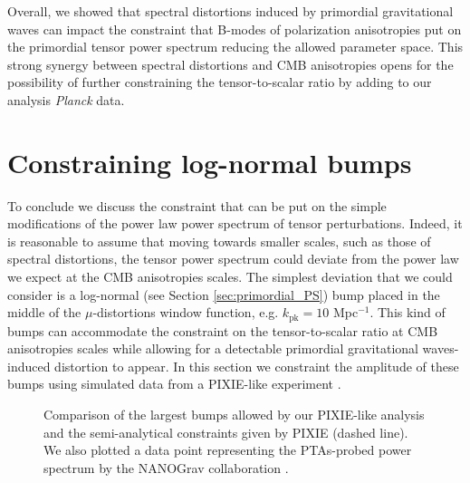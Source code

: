 Overall, we showed that spectral distortions induced by primordial gravitational waves can impact the constraint that B-modes of polarization anisotropies put on the primordial tensor power spectrum reducing the allowed parameter space.
This strong synergy between spectral distortions and CMB anisotropies opens for the possibility of further constraining the tensor-to-scalar ratio by adding to our analysis \textit{Planck} data. 
\section{Constraining log-normal bumps}
To conclude we discuss the constraint that can be put on the simple modifications of the power law power spectrum of tensor perturbations. Indeed, it is reasonable to assume that moving towards smaller scales, such as those of spectral distortions, the tensor power spectrum could deviate from the power law we expect at the CMB anisotropies scales. The simplest deviation that we could consider is a log-normal (see Section \ref{sec:primordial_PS}) bump placed in the middle of the $\mu$-distortions window function, e.g. $k_\text{pk}=10$ Mpc$^{-1}$. This kind of bumps can accommodate the constraint on the tensor-to-scalar ratio at CMB anisotropies scales while allowing for a detectable primordial gravitational waves-induced distortion to appear.
In this section we constraint the amplitude of these bumps using simulated data from a PIXIE-like experiment \cite{pixie}.
\begin{figure}[t]
    \centering
{}
\caption{Comparison of the largest bumps allowed by our PIXIE-like analysis and the semi-analytical constraints given by PIXIE (dashed line). We also plotted a data point representing the PTAs-probed power spectrum by the NANOGrav collaboration \cite{NANOGrav}. }
\label{fig:analy_const_bump}
\end{figure}

